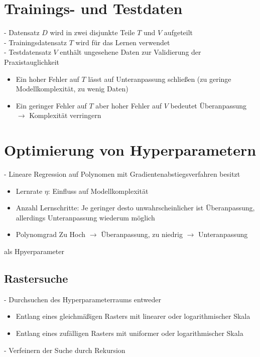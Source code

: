 \documentclass{report}
\begin{document}
\section{Trainings- und Testdaten}
- Datensatz $D$ wird in zwei disjunkte Teile $T$ und $V$ aufgeteilt\\
- Trainingsdatensatz $T$ wird für das Lernen verwendet\\
- Testdatensatz $V$ enthält ungesehene Daten zur Validierung der Praxistauglichkeit\
\vspace*{-1.25em}
\begin{itemize}
  \item Ein hoher Fehler auf $T$ lässt auf Unteranpassung schließen (zu geringe Modellkomplexität, zu wenig Daten)
  \item Ein geringer Fehler auf $T$ aber hoher Fehler auf $V$ bedeutet Überanpassung $\rightarrow$ Komplexität verringern
\end{itemize}

\section{Optimierung von Hyperparametern}
- Lineare Regression auf Polynomen mit Gradientenabstiegsverfahren besitzt\\
\vspace*{-1.25em}
\begin{itemize}
  \item Lernrate $\eta$: Einfluss auf Modellkomplexität
  \item Anzahl Lernschritte: Je geringer desto unwahrscheinlicher ist Überanpassung, allerdings Unteranpassung wiederum möglich
  \item Polynomgrad Zu Hoch $\rightarrow$ Überanpassung, zu niedrig $\rightarrow$ Unteranpassung
\end{itemize}
als Hpyerparameter

\subsection{Rastersuche}
- Durchsuchen des Hyperparameterraums entweder\\
\vspace*{-1.25em}
\begin{itemize}
  \item Entlang eines gleichmäßigen Rasters mit linearer oder logarithmischer Skala
  \item Entlang eines zufälligen Rasters mit uniformer oder logarithmischer Skala
\end{itemize}
- Verfeinern der Suche durch Rekursion
\end{document}
